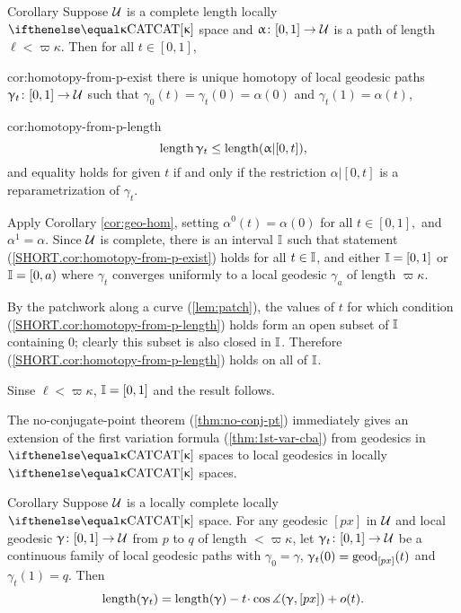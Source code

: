 \begin{thm}{Corollary}\label{cor:homotopy-from-p}
Suppose $\mathcal{U}$ is a complete length  locally $\CAT\kappa$ space 
and $\alpha\:[0,1]\to \spc{U}$ is a path of length $\ell<\varpi\kappa$.
Then  for all $t\in[0,1]$,

\begin{subthm}{cor:homotopy-from-p-exist}
there is unique homotopy of local geodesic paths $\gamma_t\:[0,1]\to \spc{U}$
such that $\gamma_0(t)=\gamma_t(0)=\alpha(0)$ and $\gamma_t(1)=\alpha(t)$,
\end{subthm}

\begin{subthm}{cor:homotopy-from-p-length}
\[\length\gamma_t\le\length(\alpha|[0,t]),\]
and  equality holds for given $t$ if and only if the restriction $\alpha|[0,t]$ is a reparametrization of $\gamma_t$.
\end{subthm}
\end{thm}

Apply Corollary \ref{cor:geo-hom}, setting $\alpha^0(t)=\alpha(0)$ for all $t\in [0,1],$ and $\alpha^1=\alpha$. Since $\mathcal{U}$ is complete,  there is an interval $\mathbb{I}$ such that statement (\ref{SHORT.cor:homotopy-from-p-exist}) holds for all $t\in\II$, and either $\mathbb{I}=[0,1]$ or $\mathbb{I}=[0,a)$ where $\gamma_t$ converges uniformly to a local geodesic $\gamma_a$ of length $\varpi\kappa$.

By the patchwork along a curve (\ref{lem:patch}), the values of $t$ for which condition (\ref{SHORT.cor:homotopy-from-p-length}) holds form an open subset of $\mathbb{I}$ containing $0$; clearly this subset is also closed in $\mathbb{I}$. Therefore (\ref{SHORT.cor:homotopy-from-p-length}) holds on all of $\mathbb{I}$. 
 
Sinse $\ell<\varpi\kappa$, 
$\mathbb{I}=[0,1]$ and the result follows. 
\qeds

The no-conjugate-point theorem  (\ref{thm:no-conj-pt}) immediately gives an extension of the first variation formula (\ref{thm:1st-var-cba}) from geodesics in $\CAT\kappa$ spaces to local geodesics in locally $\CAT\kappa$ spaces.

  \begin{thm}{Corollary}\label{cor:1st-var++cba}
Suppose $\mathcal{U}$ is a locally complete locally $\CAT\kappa$ space. 
For any geodesic $[px]$ in $\mathcal{U}$ and local geodesic $\gamma\:[0,1]\to \spc{U}$ from $p$ to $q$ of  length $<\varpi\kappa$, let  $\gamma_t\:[0,1]\to \spc{U}$ be a continuous family of local geodesic paths with $\gamma_0=\gamma$, $\upgamma_t(0)=\mathrm{geod}_{[p x]}(t)$ and $\gamma_t(1)=q$.  Then
\[\length(\gamma_t)
=
\length(\gamma)-t\cdot\cos\mangle(\gamma,[px])+o(t).
\]

\end{thm}




